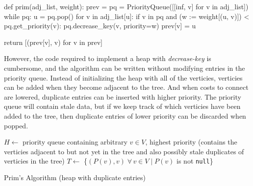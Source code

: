 \documentclass[12pt, titlepage]{article}
\begin{document}
\begin{python}
def prim(adj_list, weight):
    prev = {}
    pq = PriorityQueue([[inf, v] for v in adj_list])
    while pq:
        u = pq.pop()
        for v in adj_list[u]:
            if v in pq and (w := weight[(u, v)]) < pq.get_priority(v):
                pq.decrease_key(v, priority=w)
                prev[v] = u

    return [(prev[v], v) for v in prev]
\end{python}

However, the code required to implement a heap with \textit{decrease-key} is cumbersome, and the algorithm can be written without modifying entries in the priority queue. Instead of initializing the heap with all of the verticies, verticies can be added when they become adjacent to the tree. And when costs to connect are lowered, duplicate entries can be inserted with higher priority. The priority queue will contain stale data, but if we keep track of which verticies have been added to the tree, then duplicate entries of lower priority can be discarded when popped. \\

\begin{algorithm}[H]
  \SetAlgoLined
  \DontPrintSemicolon
  $H \longleftarrow$\hspace{0.5mm} priority queue containing arbitrary $v\in V$, highest priority\;
  \hspace{13mm}(contains the verticies adjacent to but not yet in the tree and\;
  \hspace{13mm}also possibly stale duplicates of verticies in the tree)\;
  $T \longleftarrow$\hspace{0.5mm} \{$(P(v), v)\;\forall\,v\in V\mid P(v)$ is not \texttt{null}\}\;
  \;
    \caption{Prim's Algorithm (heap with duplicate entries)}
\end{algorithm} \medskip
\end{document}
